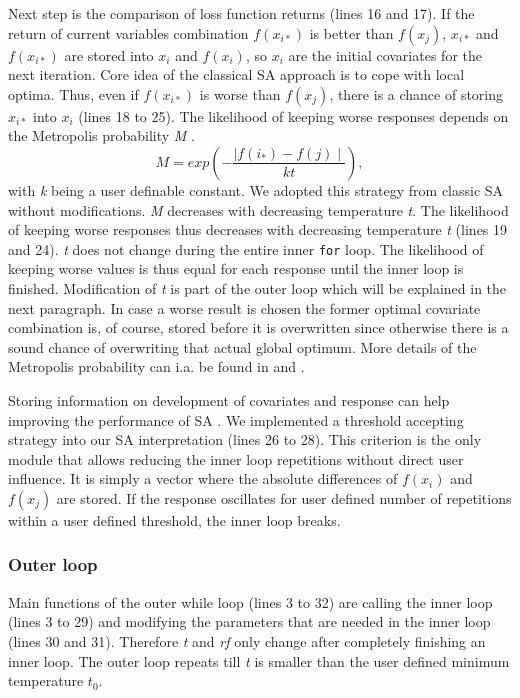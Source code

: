 Next step is the comparison of loss function returns (lines 16 and 17). If the return of current variables combination $f(x_{i*})$ is better than $f(x_j)$, $x_{i*}$ and $f(x_{i*})$ are stored into $x_{i}$ and $f(x_{i})$, so $x_{i}$ are the initial covariates for the next iteration. Core idea of the classical SA approach is to cope with local optima. Thus, even if $f(x_{i*})$ is worse than $f(x_{j})$, there is a chance of storing $x_{i*}$ into $x_{i}$ (lines 18 to 25). The likelihood of keeping worse responses depends on the Metropolis probability \textit{M} \citep{metropolis_1953}.
\begin{equation}
\label{eq:eq1}
M = exp \left(-\frac{\mid f(i_*)-f(j)\mid}{kt}\right),
\end{equation}
with \textit{k} being a user definable constant. We adopted this strategy from classic SA without modifications. \textit{M} decreases with decreasing temperature \textit{t}. The likelihood of keeping worse responses thus decreases with decreasing temperature \textit{t} (lines 19 and 24). \textit{t} does not change during the entire inner \texttt{for} loop. The likelihood of keeping worse values is thus equal for each response until the inner loop is finished. Modification of \textit{t} is part of the outer loop which will be explained in the next paragraph. In case a worse result is chosen the former optimal covariate combination is, of course, stored before it is overwritten since otherwise there is a sound chance of overwriting that actual global optimum. More details of the Metropolis probability can i.a. be found in \citet{kirkpatrick_1983} and \citet{metropolis_1953}.

Storing information on development of covariates and response can help improving the performance of SA \citep{lin_1995, hansen_2012}. We implemented a threshold accepting strategy \citep{dueck_1990} into our SA interpretation (lines 26 to 28). This criterion is the only module that allows reducing the inner loop repetitions without direct user influence. It is simply a vector where the absolute differences of $f(x_{i})$ and $f(x_j)$ are stored. If the response oscillates for user defined number of repetitions within a user defined threshold, the inner loop breaks.

\subsubsection{Outer loop}
Main functions of the outer while loop (lines 3 to 32) are calling the inner loop (lines 3 to 29) and modifying the parameters that are needed in the inner loop (lines 30 and 31). Therefore \textit{t} and \textit{rf} only change after completely finishing an inner loop. The outer loop repeats till \textit{t} is smaller than the user defined minimum temperature $t_0$.

